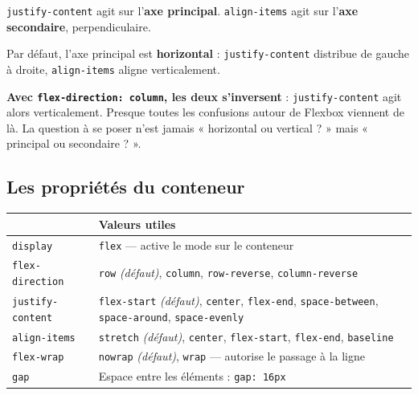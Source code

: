 \documentclass[a4paper,11pt]{article}
\newcommand{\hdr}[1]{\multicolumn{1}{l}{\color{white}\bfseries #1}}
\renewcommand{\arraystretch}{1.3}
\begin{document}
\begin{tcolorbox}[attention, title={La clé de Flexbox : deux axes, deux propriétés}]
\texttt{justify-content} agit sur l'\textbf{axe principal}. \texttt{align-items} agit sur l'\textbf{axe secondaire}, perpendiculaire.

\vspace{3pt}
Par défaut, l'axe principal est \textbf{horizontal} : \texttt{justify-content} distribue de gauche à droite, \texttt{align-items} aligne verticalement.

\vspace{3pt}
\textbf{Avec \texttt{flex-direction: column}, les deux s'inversent} : \texttt{justify-content} agit alors verticalement. Presque toutes les confusions autour de Flexbox viennent de là. La question à se poser n'est jamais « horizontal ou vertical ? » mais « principal ou secondaire ? ».
\end{tcolorbox}

\subsection{Les propriétés du conteneur}

\begin{center}
\renewcommand{\arraystretch}{1.0}
\begin{tabularx}{\linewidth}{p{3.2cm}X}
  \toprule
  \rowcolor{uniNavy}
  \hdr{Propriété} & \hdr{Valeurs utiles} \\
  \midrule
  \rowcolor{uniPaper}
  \texttt{display} & \texttt{flex} --- active le mode sur le conteneur \\
  \texttt{flex-direction} & \texttt{row} \textit{(défaut)}, \texttt{column}, \texttt{row-reverse}, \texttt{column-reverse} \\
  \rowcolor{uniPaper}
  \texttt{justify-content} & \texttt{flex-start} \textit{(défaut)}, \texttt{center}, \texttt{flex-end}, \texttt{space-between}, \texttt{space-around}, \texttt{space-evenly} \\
  \texttt{align-items} & \texttt{stretch} \textit{(défaut)}, \texttt{center}, \texttt{flex-start}, \texttt{flex-end}, \texttt{baseline} \\
  \rowcolor{uniPaper}
  \texttt{flex-wrap} & \texttt{nowrap} \textit{(défaut)}, \texttt{wrap} --- autorise le passage à la ligne \\
  \texttt{gap} & Espace entre les éléments : \texttt{gap: 16px} \\
  \bottomrule
\end{tabularx}
\end{center}
\end{document}
